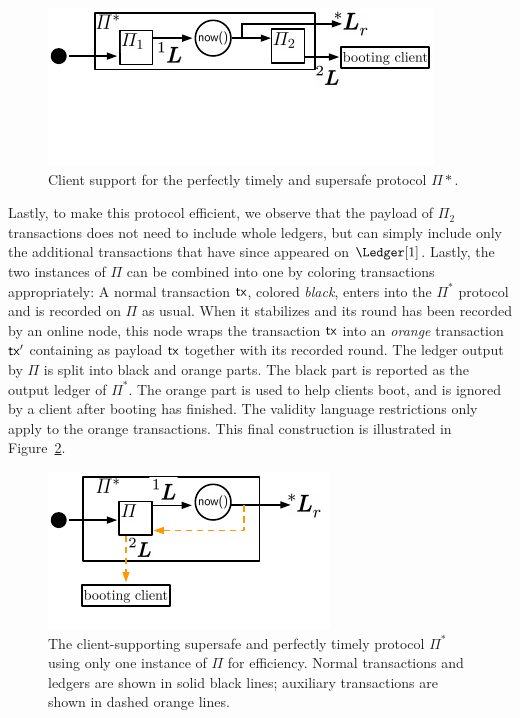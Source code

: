 \begin{figure}
  \centering
  \includegraphics[width=0.7\columnwidth,keepaspectratio]{figures/perfectly-timely-clients.pdf}
  \caption{Client support for the perfectly timely and supersafe protocol $\Pi*$.
  }
 \label{fig:client-support}
\end{figure}

Lastly, to make this protocol efficient, we observe that the payload of
$\Pi_2$ transactions does not need to include whole ledgers, but can simply
include only the additional transactions that have since appeared on $\Ledger[1]$.
Lastly, the two instances of $\Pi$ can be combined into one by coloring
transactions appropriately: A normal transaction $\textsf{tx}$, colored \emph{black}, enters into the
$\Pi^*$ protocol and is recorded on $\Pi$ as usual. When it stabilizes and its round
has been recorded by an online node, this node wraps the transaction $\textsf{tx}$ into an
\emph{orange} transaction $\textsf{tx}'$ containing as payload $\textsf{tx}$ together with its recorded
round. The ledger output by $\Pi$ is split into black and orange parts. The black part
is reported as the output ledger of $\Pi^*$. The orange part is used to help clients boot,
and is ignored by a client after booting has finished. The validity language restrictions
only apply to the orange transactions. This final construction is illustrated in
Figure~\ref{fig:client-support-feedback}.

\begin{figure}
  \centering
  \includegraphics[width=0.55\columnwidth,keepaspectratio]{figures/perfectly-timely-clients-feedback.pdf}
  \caption{The client-supporting supersafe and perfectly timely protocol $\Pi^*$
           using only one instance of $\Pi$ for efficiency.
           Normal transactions and ledgers are shown in solid black lines;
           auxiliary transactions are shown in dashed
           orange lines.}
 \label{fig:client-support-feedback}
\end{figure}

